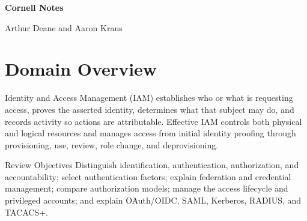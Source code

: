 \documentclass[10pt,letterpaper]{article}
\begin{document}
\hypersetup{pageanchor=false}
\begin{titlepage}\pagecolor{navy}\color{white}\vspace{0.25in}{\large Sixth Edition \textbullet\ 2021\par}\vfill{\Huge\bfseries Cornell Notes\par}\vspace{0.25in}{\LARGE Domain 5\par}\vspace{0.08in}{\LARGE\bfseries Identity and Access Management\par}\vfill{\large Arthur Deane and Aaron Kraus\par}\vspace{0.12in}{\normalsize Study and review companion\par}\end{titlepage}
\hypersetup{pageanchor=true}\nopagecolor\color{black}

\section*{\color{navy}Domain Overview}
Identity and Access Management (IAM) establishes who or what is requesting access, proves the asserted identity, determines what that subject may do, and records activity so actions are attributable. Effective IAM controls both physical and logical resources and manages access from initial identity proofing through provisioning, use, review, role change, and deprovisioning.

\begin{summarybox}{Review Objectives}
Distinguish identification, authentication, authorization, and accountability; select authentication factors; explain federation and credential management; compare authorization models; manage the access lifecycle and privileged accounts; and explain OAuth/OIDC, SAML, Kerberos, RADIUS, and TACACS+.
\end{summarybox}
\end{document}

